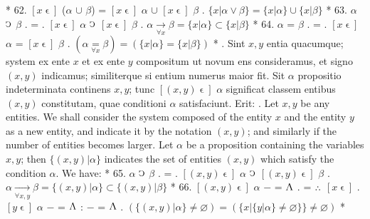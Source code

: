 \documentclass{book}
\newcommand{\C}{\mathop{\sbox0{$\displaystyle$$\reflectbox{C}$} %
\raisebox{-\height+\ht0-0.05cm}[\ht0][\dp0]{\scalebox{0.8}[0.8]{\copy0}}}\displaylimits} %
\newcommand{\pppNoSpace}{\leavevmode\lower0ex\hbox{.}\kern-0.1em\raise0.7ex\hbox{.}\kern-0.1em\lower0ex\hbox{.}} %
\newcommand{\abs}{\mathop{\rotatebox[origin=c]{180}{V}}}
\newcommand{\smallIn}{\ensuremath{\mathrel{\epsilon}}}
\newenvironment{translateTwoCol}
               { %
                 \columnratio{0.5, 0.5} \begin{paracol}{2}
                 \newcommand{\LAT}{\switchcolumn[0]*}
                 \newcommand{\ENG}{\switchcolumn[1]}
               }
               { %
                 \let\ENG\undefined
                 \let\LAT\undefined
                 \end{paracol}
               }
\begin{document}
\begin{translateTwoCol}
\LAT
62. \hspace{0.67cm} $[x\smallIn]$ ($\alpha$ $\cup$ $\beta$) = $[x\smallIn]$ $\alpha$ $\cup$ $[x\smallIn]$ $\beta$
\ENG
62. \hspace{0.67cm} $\{ x | \alpha \vee \beta \} = \{ x | \alpha \} \cup \{ x | \beta \}$
\LAT
63. \hspace{0.67cm} $\alpha$ $\C$\scalebox{0.7}{$x$} $\beta$ . = . $[x\smallIn]$ $\alpha$  $\C$ $[x\smallIn]$ $\beta$
\ENG
63. \hspace{0.67cm} $\alpha \xrightarrow[\forall x]{} \beta = \{x | \alpha\} \subset \{x | \beta \}$
\LAT
64. \hspace{0.67cm} $\alpha$ =\scalebox{0.7}{$x$} $\beta$ . = . $[x\smallIn]$ $\alpha$ = $[x\smallIn]$ $\beta$
\ENG
64. \hspace{0.67cm} $(\alpha \underset{\forall x}= \beta) = (\{ x |  \alpha\} = \{x | \beta \} )$
\LAT
{}. Sint $x,y$ entia quacumque; system ex ente $x$ et ex ente $y$ compositum ut novum ens consideramus, et signo $(x,y)$ indicamus; similiterque si entium numerus maior fit. Sit $\alpha$ propositio indeterminata continens $x,y$; tunc $[(x,y)\smallIn]$ $\alpha$ significat classem entibus $(x,y)$ constitutam, quae conditioni $\alpha$ satisfaciunt. Erit:
\ENG
{}. Let $x,y$ be any entities. We shall consider the system composed of the entity $x$ and the entity $y$ as a new entity, and indicate it by the notation $(x,y)$; and similarly if the number of entities becomes larger. Let $\alpha$ be a proposition containing the variables $x,y$; then $\{(x,y) | \alpha \}$ indicates the set of entities $(x,y)$ which satisfy the condition $\alpha$. We have:   %
\LAT
65. \hspace{0.67cm} $\alpha$ $\C$\scalebox{0.7}{$x, y$} $\beta$ . = . $[(x, y)\smallIn]$ $\alpha$  $\C$ $[(x, y)\smallIn]$ $\beta$
\ENG
65. \hspace{0.67cm} $\alpha \xrightarrow[\forall x,y]{} \beta = \{(x,y) | \alpha\} \subset \{(x,y) | \beta \}$
\LAT
66. \hspace{0.67cm} $[(x, y)\smallIn]$ $\alpha$ $-$ = $\abs$ . = $\pppNoSpace$ $[x\smallIn]$ . $[y\smallIn]$ $\alpha$ $-$ = $\abs$ : $-$ = $\abs$
\ENG
66. \hspace{0.67cm} $( \{ (x,y) | \alpha \} \neq \varnothing ) = ( \{ x | \{ y | \alpha \} \neq \varnothing \} \} \neq \varnothing )$   %
\LAT

\end{translateTwoCol}
\end{document}
